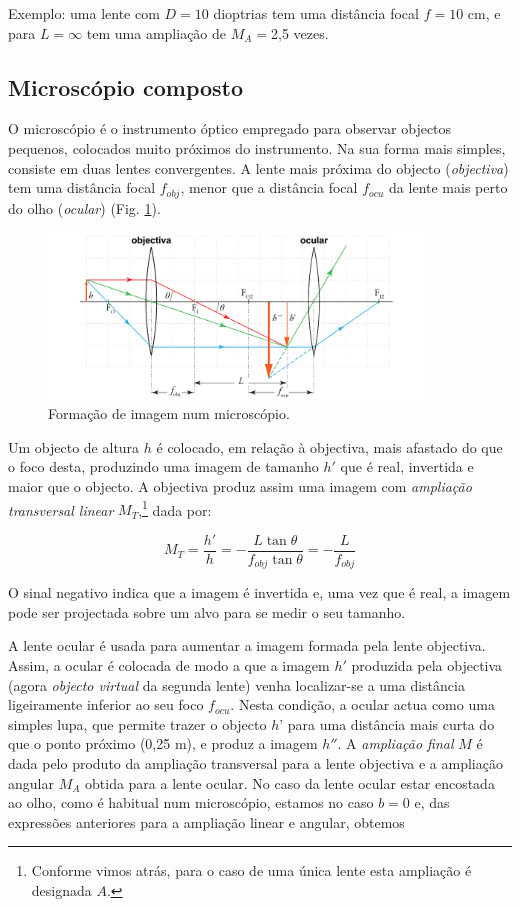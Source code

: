 \documentclass[a4paper,twoside,11pt]{report}      %
\begin{document}
Exemplo: uma lente com $D=10$ dioptrias tem uma distância focal $f=10$ cm, e para $L=\infty$ tem uma ampliação de $M_A=$2,5 vezes.


\subsection{\sf Microscópio composto}

O microscópio é o instrumento óptico empregado para observar objectos pequenos, colocados muito próximos do instrumento. Na sua forma mais simples, consiste em duas lentes convergentes. A lente mais próxima do objecto (\emph{objectiva}) tem uma distância focal $f_{obj}$, menor que a distância focal $f_{ocu}$ da lente mais perto do olho (\emph{ocular}) (Fig. \ref{fig:microscopio}).

\begin{figure}
	[!htb]  \centering 
	\includegraphics[width=0.9\textwidth]{microscopio}
		\caption{Formação de imagem num microscópio. \label{fig:microscopio}} 
\end{figure}

Um objecto de altura $h$ é colocado, em relação à objectiva, mais afastado do que o foco desta, produzindo uma imagem de tamanho $h'$ que é real, invertida e maior que o objecto. A objectiva produz assim uma imagem com \emph{ampliação transversal linear} $M_T$,\footnote{Conforme vimos atrás, para o caso de uma única lente esta ampliação é designada $A$.} dada por:

\begin{equation}
M_T=\frac{h'}{h} = -\frac{L\tan\theta}{f_{obj}\tan\theta}= -\frac{L}{f_{obj}}
\end{equation}

O sinal negativo indica que a imagem é invertida e, uma vez que é real, a imagem pode ser projectada sobre um alvo para se medir o seu tamanho.

A lente ocular é usada para aumentar a imagem formada pela lente objectiva. Assim, a ocular é colocada de modo a que a imagem $h'$ produzida pela objectiva (agora \emph{objecto virtual} da segunda lente) venha localizar-se a uma distância ligeiramente inferior ao seu foco $f_{ocu}$. Nesta condição, a ocular actua como uma simples lupa, que permite trazer o objecto $h’$ para uma distância mais curta do que o ponto próximo (0,25 m), e produz a imagem $h''$. A \emph{ampliação final} $M$ é dada pelo produto da ampliação transversal para a lente objectiva e a ampliação angular $M_A$ obtida para a lente ocular. No caso da lente ocular estar encostada ao olho, como é habitual num microscópio, estamos no caso $b=0$ e, das expressões anteriores para a ampliação linear e angular, obtemos
\end{document}
